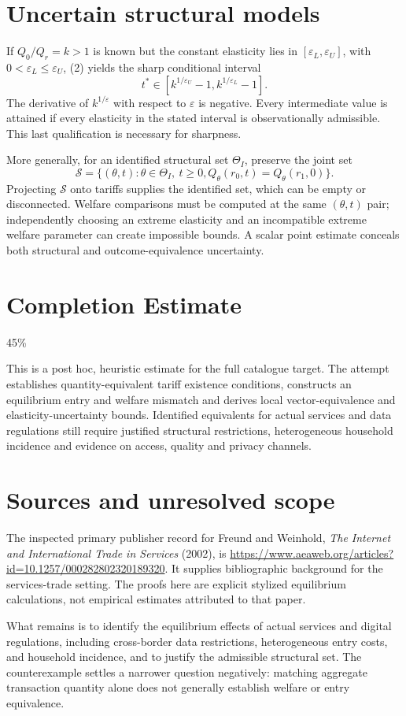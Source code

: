 \documentclass[11pt]{article}
\begin{document}
\section*{Uncertain structural models}
If $Q_0/Q_r=k>1$ is known but the constant elasticity lies in $[\varepsilon_L,\varepsilon_U]$, with $0<\varepsilon_L\leq\varepsilon_U$, (2) yields the sharp conditional interval
\[
 t^*\in[k^{1/\varepsilon_U}-1,k^{1/\varepsilon_L}-1].         \tag{9}
\]
The derivative of $k^{1/\varepsilon}$ with respect to $\varepsilon$ is negative. Every intermediate value is attained if every elasticity in the stated interval is observationally admissible. This last qualification is necessary for sharpness.

More generally, for an identified structural set $\Theta_I$, preserve the joint set
\[
 \mathcal S=\{(\theta,t):\theta\in\Theta_I,\ t\geq0,
                       Q_\theta(r_0,t)=Q_\theta(r_1,0)\}.
\]
Projecting $\mathcal S$ onto tariffs supplies the identified set, which can be empty or disconnected. Welfare comparisons must be computed at the same $(\theta,t)$ pair; independently choosing an extreme elasticity and an incompatible extreme welfare parameter can create impossible bounds. A scalar point estimate conceals both structural and outcome-equivalence uncertainty.

\section{Completion Estimate}
45\%

This is a post hoc, heuristic estimate for the full catalogue target.
The attempt establishes quantity-equivalent tariff existence conditions, constructs an equilibrium entry and welfare mismatch and derives local vector-equivalence and elasticity-uncertainty bounds. Identified equivalents for actual services and data regulations still require justified structural restrictions, heterogeneous household incidence and evidence on access, quality and privacy channels.

\section*{Sources and unresolved scope}
The inspected primary publisher record for Freund and Weinhold, \emph{The Internet and International Trade in Services} (2002), is
\url{https://www.aeaweb.org/articles?id=10.1257/000282802320189320}.
It supplies bibliographic background for the services-trade setting. The proofs here are explicit stylized equilibrium calculations, not empirical estimates attributed to that paper.

What remains is to identify the equilibrium effects of actual services and digital regulations, including cross-border data restrictions, heterogeneous entry costs, and household incidence, and to justify the admissible structural set. The counterexample settles a narrower question negatively: matching aggregate transaction quantity alone does not generally establish welfare or entry equivalence.
\end{document}
